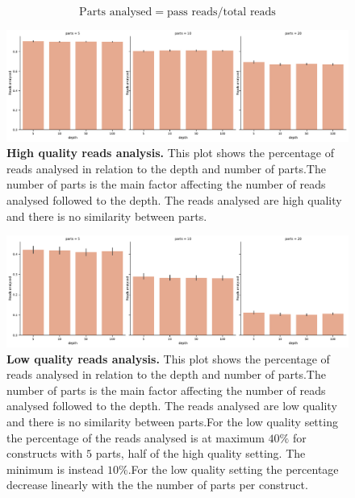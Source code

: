 \documentclass[11pt, a4paper]{article}
\begin{document}
\begin{equation}
        \text{Parts analysed} = \text{pass reads}/ \text{total reads}
\end{equation}


 \begin{figure}[ht]
    \begin{center}
    \includegraphics[width=1.35\textwidth]{../results/images_notebook/v_500/hq_sim_00_good_reads_ratio.pdf}
    \end{center}
    \caption{{\bf High quality reads analysis.}  This plot shows the percentage of reads analysed in relation to the depth and number of parts.The number of parts is the main factor affecting the number of reads analysed followed to the depth. The reads analysed are high quality and there is no similarity between parts.}
   \label{fig:v_500_hq_sim_00_good_reads_ratio}
\end{figure}


 \begin{figure}[ht]
    \begin{center}
    \includegraphics[width=1.35\textwidth]{../results/images_notebook/v_500/lq_sim_00_good_reads_ratio.pdf}
    \end{center}
    \caption{{\bf Low quality reads analysis.}  This plot shows the percentage of reads analysed in relation to the depth and number of parts.The number of parts is the main factor affecting the number of reads analysed followed to the depth. The reads analysed are low quality and there is no similarity between parts.For the low quality setting the percentage of the reads analysed is at maximum $40\%$ for constructs with $5$ parts, half of the high quality setting. The minimum is instead $10\%$.For the low quality setting the percentage decrease linearly with the the number of parts per construct.}
   \label{fig:v_500_lq_sim_00_good_reads_ratio}
\end{figure}
\end{document}
